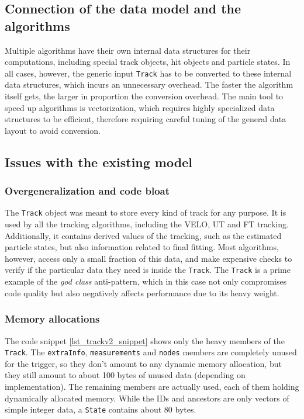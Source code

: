 \documentclass[12pt]{article}
\newcommand{\code}[1]{\texttt{#1}}
\begin{document}
\subsection{Connection of the data model and the algorithms}

Multiple algorithms have their own internal data structures for their computations, including special track objects, hit objects and particle states. In all cases, however, the generic input \code{Track} has to be converted to these internal data structures, which incurs an unnecessary overhead. The faster the algorithm itself gets, the larger in proportion the conversion overhead. The main tool to speed up algorithms is vectorization, which requires highly specialized data structures to be efficient, therefore requiring careful tuning of the general data layout to avoid conversion.

\subsection{Issues with the existing model}

\subsubsection{Overgeneralization and code bloat}

The \code{Track} object was meant to store every kind of track for any purpose. It is used by all the tracking algorithms, including the VELO, UT and FT tracking. Additionally, it contains derived values of the tracking, such as the estimated particle states, but also information related to final fitting. Most algorithms, however, access only a small fraction of this data, and make expensive checks to verify if the particular data they need is inside the \code{Track}. The \code{Track} is a prime example of the \textit{god class} anti-pattern, which in this case not only compromises code quality but also negatively affects performance due to its heavy weight.

\subsubsection{Memory allocations}

The code snippet \ref{lst_trackv2_snippet} shows only the heavy members of the \code{Track}. The \code{extraInfo}, \code{measurements} and \code{nodes} members are completely unused for the trigger, so they don't amount to any dynamic memory allocation, but they still amount to about 100 bytes of unused data (depending on implementation). The remaining members are actually used, each of them holding dynamically allocated memory. While the IDs and ancestors are only vectors of simple integer data, a \code{State} contains about 80 bytes.
\end{document}
